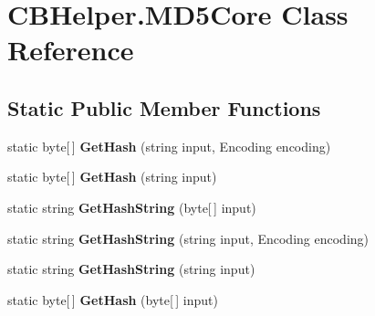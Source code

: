 \section{C\-B\-Helper.\-M\-D5\-Core Class Reference}
\label{class_c_b_helper_1_1_m_d5_core}
\subsection*{Static Public Member Functions}
\begin{DoxyCompactItemize}
\item 
static byte[$\,$] {\bfseries Get\-Hash} (string input, Encoding encoding)\label{class_c_b_helper_1_1_m_d5_core_ae6642051fc17e011ed5b8a81fac60663}

\item 
static byte[$\,$] {\bfseries Get\-Hash} (string input)\label{class_c_b_helper_1_1_m_d5_core_aeda797eb33845612eaf57ce9042261a0}

\item 
static string {\bfseries Get\-Hash\-String} (byte[$\,$] input)\label{class_c_b_helper_1_1_m_d5_core_a590e978b37d75406a282ca2b5374badd}

\item 
static string {\bfseries Get\-Hash\-String} (string input, Encoding encoding)\label{class_c_b_helper_1_1_m_d5_core_a1358bd2d1d872e88e3a0a95cd6cfe0f7}

\item 
static string {\bfseries Get\-Hash\-String} (string input)\label{class_c_b_helper_1_1_m_d5_core_a7d2dd136def5782d4b13d7ba93dba02f}

\item 
static byte[$\,$] {\bfseries Get\-Hash} (byte[$\,$] input)\label{class_c_b_helper_1_1_m_d5_core_afe1323ab3768b3961b685346f11ff6c5}

\end{DoxyCompactItemize}
